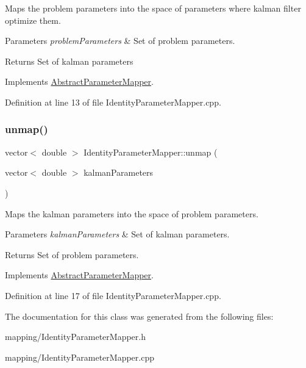 Maps the problem parameters into the space of parameters where kalman filter optimize them. 
\begin{DoxyParams}{Parameters}
{\em problem\+Parameters} & Set of problem parameters. \\
\hline
\end{DoxyParams}
\begin{DoxyReturn}{Returns}
Set of kalman parameters 
\end{DoxyReturn}


Implements \mbox{\hyperlink{classAbstractParameterMapper_abb9e78545ff023f2b786b759ec2d23e4}{Abstract\+Parameter\+Mapper}}.



Definition at line 13 of file Identity\+Parameter\+Mapper.\+cpp.

\mbox{\label{classIdentityParameterMapper_ad7ad11e683701104024a553eb8f2373b}} 
\subsubsection{\texorpdfstring{unmap()}{unmap()}}
{\footnotesize\ttfamily vector$<$ double $>$ Identity\+Parameter\+Mapper\+::unmap (\begin{DoxyParamCaption}\item[{vector$<$ double $>$}]{kalman\+Parameters }\end{DoxyParamCaption})\hspace{0.3cm}{\ttfamily [virtual]}}

Maps the kalman parameters into the space of problem parameters. 
\begin{DoxyParams}{Parameters}
{\em kalman\+Parameters} & Set of kalman parameters. \\
\hline
\end{DoxyParams}
\begin{DoxyReturn}{Returns}
Set of problem parameters. 
\end{DoxyReturn}


Implements \mbox{\hyperlink{classAbstractParameterMapper_a7fc9715759582e218a3bc38ec43e2d57}{Abstract\+Parameter\+Mapper}}.



Definition at line 17 of file Identity\+Parameter\+Mapper.\+cpp.



The documentation for this class was generated from the following files\+:\begin{DoxyCompactItemize}
\item 
mapping/Identity\+Parameter\+Mapper.\+h\item 
mapping/Identity\+Parameter\+Mapper.\+cpp\end{DoxyCompactItemize}
